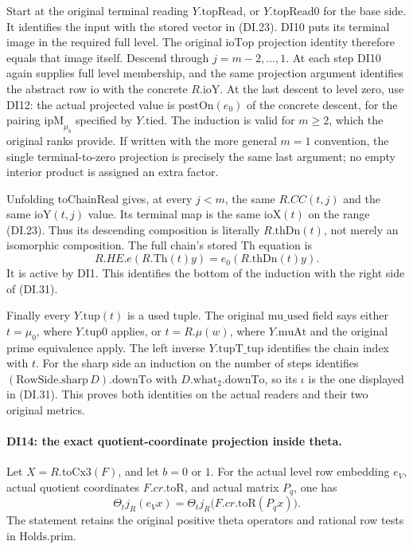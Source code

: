 Start at the original terminal reading \(Y.\mathrm{topRead}\),
or \(Y.\mathrm{topRead0}\) for the base side. It identifies the
input with the stored vector in (DI.23). DI10 puts its terminal
image in the required full level. The original \(\mathrm{ioTop}\)
projection identity therefore equals that image itself. Descend
through \(j=m-2,\ldots,1\). At each step DI10 again supplies full
level membership, and the same projection argument identifies the
abstract row \(\mathrm{io}\) with the concrete \(R.\mathrm{ioY}\).
At the last descent to level zero, use DI12: the actual projected
value is \(\mathrm{postOn}(e_0)\) of the concrete descent, for the
pairing \(\mathrm{ipM}_{\mu_b}\) specified by \(Y.\mathrm{tied}\).
The induction is valid for \(m\ge2\), which the original ranks
provide. If written with the more general \(m=1\) convention, the
single terminal-to-zero projection is precisely the same last
argument; no empty interior product is assigned an extra factor.

Unfolding \(\mathrm{toChainReal}\) gives, at every \(j<m\), the
same \(R.CC(t,j)\) and the same \(\mathrm{ioY}(t,j)\) value.
Its terminal map is the same \(\mathrm{ioX}(t)\) on the range
(DI.23). Thus its descending composition is literally
\(R.\mathrm{thDn}(t)\), not merely an isomorphic composition.
The full chain's stored \(\mathrm{Th}\) equation is
\[
              R.HE.e(R.\mathrm{Th}(t)y)
                         =e_0(R.\mathrm{thDn}(t)y).
 \tag{DI.32}
\]
It is active by DI1. This identifies the bottom of the induction
with the right side of (DI.31).

Finally every \(Y.\mathrm{tup}(t)\) is a used tuple. The original
\(\mathrm{mu\_used}\) field says either \(t=\mu_0\), where
\(Y.\mathrm{tup0}\) applies, or \(t=R.\mu(w)\), where
\(Y.\mathrm{muAt}\) and the original prime equivalence apply.
The left inverse \(Y.\mathrm{tupT\_tup}\) identifies the chain
index with \(t\). For the sharp side an induction on the number of
steps identifies \((\mathrm{RowSide.sharp}\,D).\mathrm{downTo}\)
with \(D.\mathrm{what}_2.\mathrm{downTo}\), so its \(\iota\) is
the one displayed in (DI.31). This proves both identities on the
actual readers and their two original metrics.

\paragraph{DI14: the exact quotient-coordinate projection inside theta.}
\label{claim:DI14}
Let \(X=R.\mathrm{toCx3}(F)\), and let \(b=0\) or \(1\).
For the actual level row embedding \(e_V\), actual quotient
coordinates \(F.cr.\mathrm{toR}\), and actual matrix \(P_q\),
one has
\[
 \Theta_t j_R(e_Vx)
     =\Theta_t j_R\bigl(F.cr.\mathrm{toR}(P_qx)\bigr).
 \tag{DI.33}
\]
The statement retains the original positive theta operators and
rational row tests in \(\mathrm{Holds}.\mathrm{prim}\).

